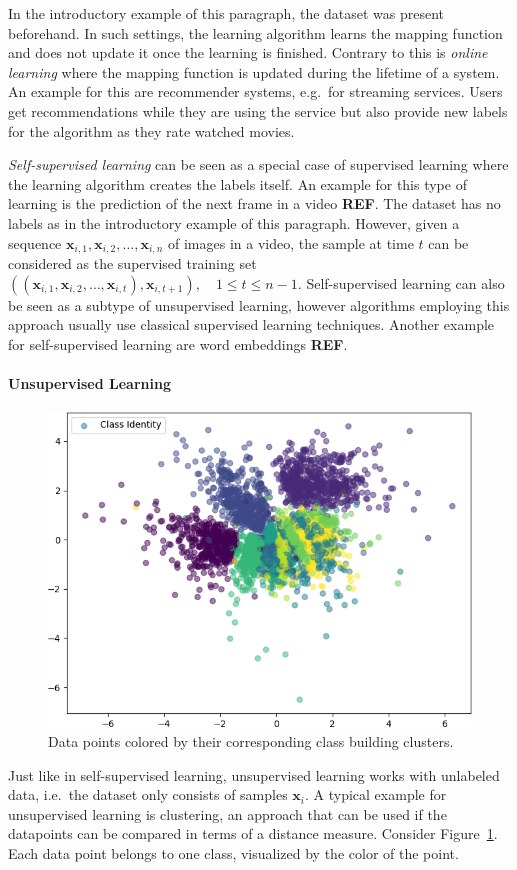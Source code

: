 In the introductory example of this paragraph, the dataset was present beforehand.
In such settings, the learning algorithm learns the mapping function and does not update it once the learning is finished.
Contrary to this is \textit{online learning} where the mapping function is updated during the lifetime of a system.
An example for this are recommender systems, e.g.~for streaming services.
Users get recommendations while they are using the service but also provide new labels for the algorithm as they rate watched movies.

\textit{Self-supervised learning} can be seen as a special case of supervised learning where the learning algorithm creates the labels itself.
An example for this type of learning is the prediction of the next frame in a video \textbf{REF}.
The dataset has no labels as in the introductory example of this paragraph.
However, given a sequence $\bm{x}_{i,1},\bm{x}_{i,2},\dots,\bm{x}_{i,n}$ of images in a video, the sample at time $t$ can be considered as the supervised training set $((\bm{x}_{i,1},\bm{x}_{i,2},\dots,\bm{x}_{i,t}),\bm{x}_{i,t+1}), \quad 1\leq t\leq n-1$.
Self-supervised learning can also be seen as a subtype of unsupervised learning, however algorithms employing this approach usually use classical supervised learning techniques.
Another example for self-supervised learning are word embeddings \textbf{REF}.

\paragraph{Unsupervised Learning}
\begin{figure}
    \centering
    \includegraphics[width=.48\textwidth]{images/latent_spaces/mnist/vae/embeddings_mu_6.png}
    \caption[Clusters of data points]{Data points colored by their corresponding class building clusters.}
    \label{fig:clustering_example}
\end{figure}
Just like in self-supervised learning, unsupervised learning works with unlabeled data, i.e.~the dataset only consists of samples $\bm{x}_i$.
A typical example for unsupervised learning is clustering, an approach that can be used if the datapoints can be compared in terms of a distance measure.
Consider Figure~\ref{fig:clustering_example}.
Each data point belongs to one class, visualized by the color of the point.

